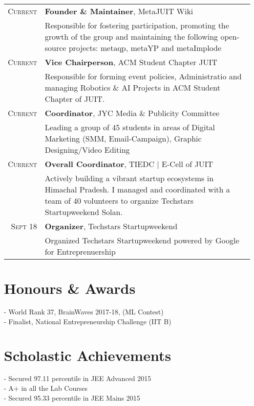 \documentclass[a4paper,10pt]{extarticle}
\begin{document}
\begin{tabular}{r|p{17.5cm}}
\textsc{Current} & \textbf{Founder \& Maintainer}, MetaJUIT Wiki\\
& {Responsible for fostering participation, promoting the growth of the group and maintaining the following open-source projects: metaqp, metaYP and metaImplode}\\
\textsc{Current} & \textbf{Vice Chairperson}, ACM Student Chapter JUIT \\
& {Responsible for forming event policies, Administratio and managing Robotics \& AI Projects in ACM Student Chapter of JUIT.}\\
\textsc{Current} &
\textbf{Coordinator}, JYC Media \& Publicity Committee \\

& {Leading a group of 45 students in areas of Digital Marketing (SMM, Email-Campaign), Graphic Designing/Video Editing}\\
\textsc{Current} & \textbf{Overall Coordinator}, TIEDC | E-Cell of JUIT\\
& {Actively building a vibrant startup ecosystems in Himachal Pradesh. I managed and coordinated with a team of 40 volunteers to organize Techstars Startupweekend Solan.}\\
\textsc{Sept 18} & \textbf{Organizer}, Techstars Startupweekend\\
& {Organized Techstars Startupweekend powered by Google for Entreprenuership}\\


\end{tabular}

\section{\textcolor{primary}{Honours \& Awards}}

\begin{multicols}{2}
- World Rank 37, BrainWaves 2017-18, (ML Contest)\\
 - Finalist, National Entrepreneurship Challenge (IIT B)
 \end{multicols}
\section{\textcolor{primary}{Scholastic Achievements}}

\begin{multicols}{2}
- Secured 97.11 percentile in JEE Advanced 2015 \\
- A+ in all the Lab Courses\\
 - Secured 95.33 percentile in JEE Mains 2015 
 
 \end{multicols}

\end{document}
